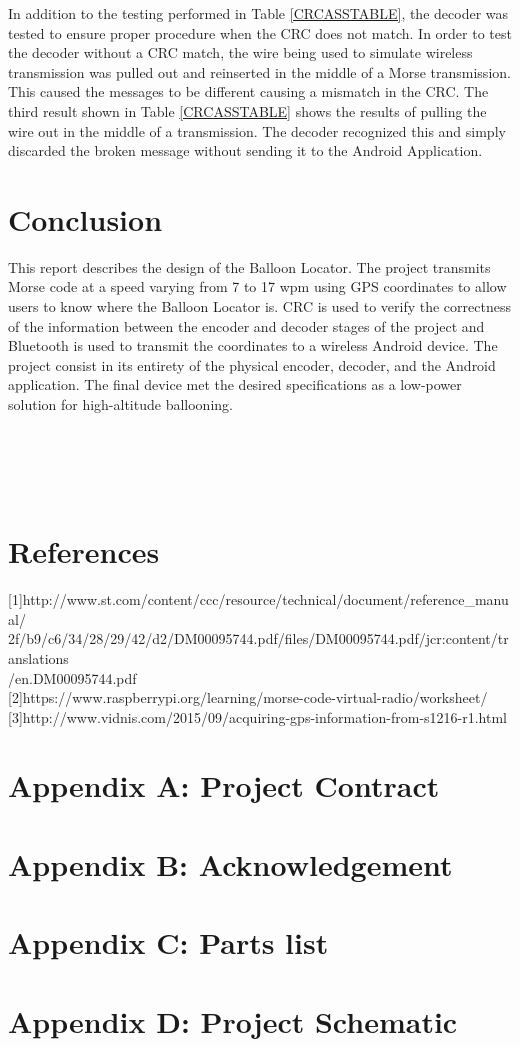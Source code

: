 \documentclass[12pt, letterpaper]{article}
\begin{document}
In addition to the testing performed in Table \ref{CRCASSTABLE}, the decoder was tested to ensure proper procedure when the CRC does not match. In order to test the decoder without a CRC match, the wire being used to simulate wireless transmission was pulled out and reinserted in the middle of a Morse transmission. This caused the messages to be different causing a mismatch in the CRC. The third result shown in Table \ref{CRCASSTABLE} shows the results of pulling the wire out in the middle of a transmission. The decoder recognized this and simply discarded the broken message without sending it to the Android Application. 



\section{Conclusion}
This report describes the design of the Balloon Locator. The project transmits Morse code at a speed varying from 7 to 17 wpm using GPS coordinates to allow users to know where the Balloon Locator is. CRC is used to verify the correctness of the information between the encoder and decoder stages of the project and Bluetooth is used to transmit the coordinates to a wireless Android device. The project consist in its entirety of the physical encoder, decoder, and the Android application. The final device met the desired specifications as a low-power solution for high-altitude ballooning.
\\
\\
\\
\\
\\
\section{References}
[1]http://www.st.com/content/ccc/resource/technical/document/reference\_manual/\\2f/b9/c6/34/28/29/42/d2/DM00095744.pdf/files/DM00095744.pdf/jcr:content/translations\\/en.DM00095744.pdf\\

[2]https://www.raspberrypi.org/learning/morse-code-virtual-radio/worksheet/\\

[3]http://www.vidnis.com/2015/09/acquiring-gps-information-from-s1216-r1.html\\



\newpage

\section*{Appendix A: Project Contract}
\newpage

\section*{Appendix B: Acknowledgement}
\newpage
\section*{Appendix C: Parts list}
\newpage
\section*{Appendix D: Project Schematic}
\end{document}
